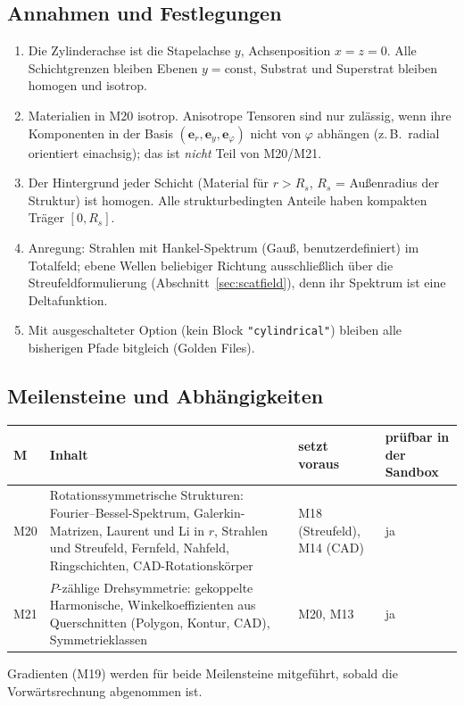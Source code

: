 \subsection{Annahmen und Festlegungen}
\begin{enumerate}[nosep]
  \item Die Zylinderachse ist die Stapelachse $y$, Achsenposition $x=z=0$. Alle Schichtgrenzen bleiben Ebenen
        $y=\text{const}$, Substrat und Superstrat bleiben homogen und isotrop.
  \item Materialien in M20 isotrop. Anisotrope Tensoren sind nur zulässig, wenn ihre Komponenten in der Basis
        $(\mathbf e_r,\mathbf e_y,\mathbf e_\varphi)$ nicht von $\varphi$ abhängen (z.\,B.\ radial orientiert einachsig);
        das ist \emph{nicht} Teil von M20/M21.
  \item Der Hintergrund jeder Schicht (Material für $r>R_s$, $R_s$ = Außenradius der Struktur) ist homogen. Alle
        strukturbedingten Anteile haben kompakten Träger $[0,R_s]$.
  \item Anregung: Strahlen mit Hankel-Spektrum (Gauß, benutzerdefiniert) im Totalfeld; ebene Wellen beliebiger
        Richtung ausschließlich über die Streufeldformulierung (Abschnitt~\ref{sec:scatfield}), denn ihr Spektrum ist
        eine Deltafunktion.
  \item Mit ausgeschalteter Option (kein Block \verb|"cylindrical"|) bleiben alle bisherigen Pfade bitgleich
        (Golden Files).
\end{enumerate}

\subsection{Meilensteine und Abhängigkeiten}
\begin{center}
\small
\begin{tabular}{p{1.0cm}p{6.6cm}p{3.0cm}p{3.8cm}}
\toprule
M & Inhalt & setzt voraus & prüfbar in der Sandbox \\
\midrule
M20 & Rotationssymmetrische Strukturen: Fourier--Bessel-Spektrum, Galerkin-Matrizen, Laurent und Li in $r$,
      Strahlen und Streufeld, Fernfeld, Nahfeld, Ringschichten, CAD-Rotationskörper & M18 (Streufeld), M14 (CAD) & ja \\
M21 & $P$-zählige Drehsymmetrie: gekoppelte Harmonische, Winkelkoeffizienten aus Querschnitten (Polygon, Kontur, CAD),
      Symmetrieklassen & M20, M13 & ja \\
\bottomrule
\end{tabular}
\end{center}
Gradienten (M19) werden für beide Meilensteine mitgeführt, sobald die Vorwärtsrechnung abgenommen ist.

